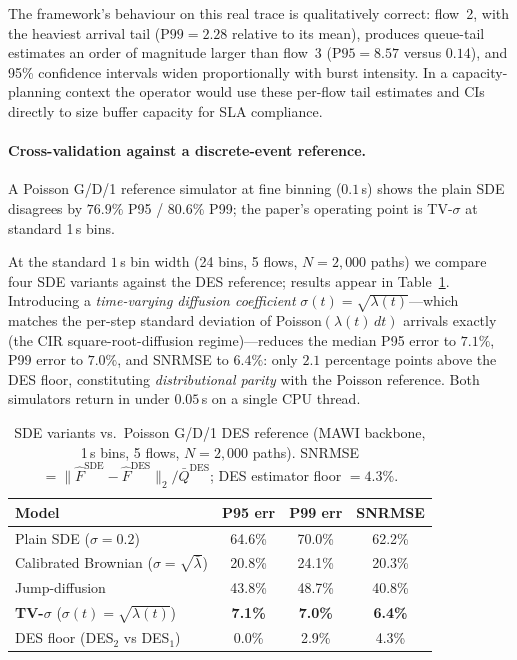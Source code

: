 \documentclass[pdflatex,sn-mathphys-num]{sn-jnl}
\theoremstyle{thmstyleone}%
\theoremstyle{thmstyletwo}%
\theoremstyle{thmstylethree}%
\begin{document}
The framework's behaviour on this real trace is qualitatively correct: flow~2, with the heaviest
arrival tail ($\mathrm{P99}=2.28$ relative to its mean), produces queue-tail estimates an order
of magnitude larger than flow~3 ($\mathrm{P95}=8.57$ versus $0.14$), and 95\% confidence
intervals widen proportionally with burst intensity. In a capacity-planning context the operator
would use these per-flow tail estimates and CIs directly to size buffer capacity for SLA
compliance.

\paragraph{Cross-validation against a discrete-event reference.}
A Poisson G/D/1 reference simulator at fine binning ($0.1$\,s) shows the plain SDE disagrees by $76.9\%$ P95 / $80.6\%$ P99; the paper's operating point is TV-$\sigma$ at standard 1\,s bins.

At the standard $1$\,s bin width (24 bins, 5 flows, $N=2{,}000$ paths) we compare four SDE
variants against the DES reference; results appear in Table~\ref{tab:sde_des_comparison}.
Introducing a \emph{time-varying diffusion coefficient} $\sigma(t)=\sqrt{\lambda(t)}$—which
matches the per-step standard deviation of Poisson$(\lambda(t)\,dt)$ arrivals exactly (the CIR
square-root-diffusion regime)—reduces the median P95 error to $7.1\%$, P99 error to $7.0\%$,
and SNRMSE to $6.4\%$: only $2.1$ percentage points above the DES floor, constituting
\emph{distributional parity} with the Poisson reference.  Both simulators return in under
$0.05$\,s on a single CPU thread.


\begin{table}[!t]
\caption{SDE variants vs.\ Poisson G/D/1 DES reference (MAWI backbone, 1\,s bins, 5 flows,
$N=2{,}000$ paths). SNRMSE $= \|\hat{F}^{\mathrm{SDE}}-\hat{F}^{\mathrm{DES}}\|_2 /
\bar{Q}^{\mathrm{DES}}$; DES estimator floor $= 4.3\%$.}
\label{tab:sde_des_comparison}
\centering
\begin{tabular}{@{}l c c c@{}}
\toprule
Model & P95 err & P99 err & SNRMSE \\
\midrule
Plain SDE ($\sigma=0.2$)                            & 64.6\% & 70.0\% & 62.2\% \\
Calibrated Brownian ($\sigma=\!\sqrt{\bar\lambda}$) & 20.8\% & 24.1\% & 20.3\% \\
Jump-diffusion                                      & 43.8\% & 48.7\% & 40.8\% \\
\textbf{TV-$\sigma$} ($\sigma(t)=\!\sqrt{\lambda(t)}$) & \textbf{7.1\%} & \textbf{7.0\%} & \textbf{6.4\%} \\
\midrule
DES floor (DES$_2$ vs DES$_1$)                      & 0.0\%  & 2.9\%  & 4.3\% \\
\bottomrule
\end{tabular}
\end{table}
\end{document}

